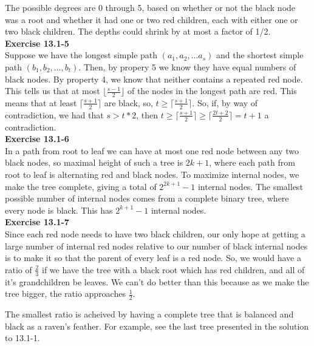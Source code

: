 \documentclass{article}
\begin{document}
The possible degrees are 0 through 5, based on whether or not the black node was a root and whether it had one or two red children, each with either one or two black children. The depths could shrink by at most a factor of 1/2. \\

\noindent\textbf{ Exercise 13.1-5} \\

Suppose we have the longest simple path $(a_1,a_2,\ldots a_s)$ and the shortest simple path $(b_1,b_2, \ldots, b_t)$. Then, by propery 5 we know they have equal numbers of black nodes. By property 4, we know that neither contains a repeated red node. This tells us that at most $\lfloor\frac{s-1}{2}\rfloor$ of the nodes in the longest path are red. This means that at least $\lceil \frac{s+1}{2} \rceil$ are black, so, $t\ge \lceil \frac{s+1}{2} \rceil$. So, if, by way of contradiction, we had that $s>t*2$, then $  t \ge \lceil \frac{s+1}{2} \rceil \ge \lceil\frac{2t+2}{2} \rceil = t+1$ a contradiction.\\

\noindent\textbf{Exercise 13.1-6}\\

In a path from root to leaf we can have at most one red node between any two black nodes, so maximal height of such a tree is $2k+1$, where each path from root to leaf is alternating red and black nodes. To maximize internal nodes, we make the tree complete, giving a total of $2^{2k+1} - 1$ internal nodes. The smallest possible number of internal nodes comes from a complete binary tree, where every node is black.  This has $2^{k+1} - 1$ internal nodes. \\

\noindent\textbf{ Exercise 13.1-7} \\

Since each red node needs to have two black children, our only hope at getting a large number of internal red nodes relative to our number of black internal nodes is to make it so that the parent of every leaf is a red node. So, we would have a ratio of $\frac{2}{3}$ if we have the tree with a black root which has red children, and all of it's grandchildren be leaves. We can't do better than this because as we make the tree bigger, the ratio approaches $\frac{1}{2}$.

The smallest ratio is acheived by having a complete tree that is balanced and black as a raven's feather. For example, see the last tree presented in the solution to 13.1-1. \\
\end{document}
